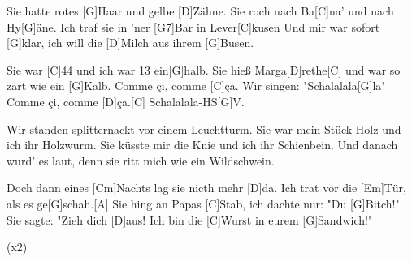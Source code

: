 

\begin{guitar}
	Sie hatte rotes [G]Haar und gelbe [D]Zähne.
	Sie roch nach Ba[C]na' und nach Hy[G]{ä}ne.
	Ich traf sie in 'ner [G7]Bar in Lever[C]kusen
	Und mir war sofort [G]klar, ich will die [D]Milch aus ihrem [G]Busen.
	
	Sie war [C]44 und ich war 13 ein[G]halb.
	Sie hieß Marga[D]rethe[C] und war so zart wie ein [G]Kalb.
	Comme çi, comme [C]{ç}a. Wir singen: "Schalalala[G]la"
	Comme çi, comme [D]{ç}a.[C] Schalalala-HS[G]V.
	
	Wir standen splitternackt vor einem Leuchtturm.
	Sie war mein Stück Holz und ich ihr Holzwurm.
	Sie küsste mir die Knie und ich ihr Schienbein.
	Und danach wurd' es laut, denn sie ritt mich wie ein Wildschwein.
	
	 
	
	Doch dann eines [Cm]Nachts lag sie nicth mehr [D]da.
	Ich trat vor die [Em]Tür, als es ge[G]schah.[A]{}
	Sie hing an Papas [C]Stab, ich dachte nur: "Du [G]Bitch!"
	Sie sagte: "Zieh dich [D]aus! Ich bin die [C]Wurst in eurem [G]Sandwich!"
	
	  (x2)
\end{guitar}